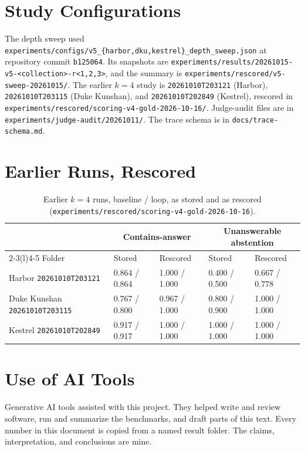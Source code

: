 \documentclass[12pt, a4paper, oneside]{report}
\begin{document}
\section{Study Configurations}

{\raggedright
The depth sweep used \texttt{experiments/configs/v5\_\{harbor,dku,kestrel\}\_depth\_sweep.json}
at repository commit \texttt{b125064}. Its snapshots are
\texttt{experiments/results/20261015-v5-<collection>-r<1,2,3>}, and the
summary is \texttt{experiments/rescored/v5-sweep-20261015/}. The earlier
$k=4$ study is \texttt{20261010T203121} (Harbor), \texttt{20261010T203115}
(Duke Kunshan), and \texttt{20261010T202849} (Kestrel), rescored in
\texttt{experiments/rescored/scoring-v4-gold-2026-10-16/}. Judge-audit files
are in \texttt{experiments/judge-audit/20261011/}. The trace schema is in
\texttt{docs/trace-schema.md}.\par}

\section{Earlier Runs, Rescored}

\begin{table}[htbp]
\centering
\footnotesize
\begin{tabular}{@{}lllll@{}}
\toprule
 & \multicolumn{2}{c}{Contains-answer} & \multicolumn{2}{c}{Unanswerable abstention} \\
\cmidrule(lr){2-3}\cmidrule(l){4-5}
Folder & Stored & Rescored & Stored & Rescored \\
\midrule
Harbor \texttt{20261010T203121} & 0.864 / 0.864 & 1.000 / 1.000 & 0.400 / 0.500 & 0.667 / 0.778 \\
Duke Kunshan \texttt{20261010T203115} & 0.767 / 0.800 & 0.967 / 1.000 & 0.800 / 0.900 & 1.000 / 1.000 \\
Kestrel \texttt{20261010T202849} & 0.917 / 0.917 & 1.000 / 1.000 & 1.000 / 1.000 & 1.000 / 1.000 \\
\bottomrule
\end{tabular}
\caption[Earlier $k=4$ runs, stored and rescored]{Earlier $k=4$ runs, baseline / loop, as stored and as rescored
(\texttt{experiments/rescored/scoring-v4-gold-2026-10-16}).}
\label{tbl:rescored}
\end{table}

\section{Use of AI Tools}

Generative AI tools assisted with this project. They helped write and review
software, run and summarize the benchmarks, and draft parts of this text.
Every number in this document is copied from a named result folder. The
claims, interpretation, and conclusions are mine.
\end{document}
